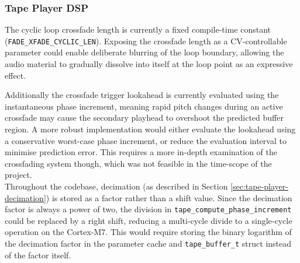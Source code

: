 \subsubsection{Tape Player DSP}
The cyclic loop crossfade length is currently a fixed compile-time constant (\texttt{FADE\_XFADE\_CYCLIC\_LEN}).
Exposing the crossfade length as a CV-controllable parameter could enable deliberate blurring of the loop boundary, allowing the audio material to gradually dissolve into itself at the loop point as an expressive effect.

Additionally the crossfade trigger lookahead is currently evaluated using the instantaneous phase increment, meaning rapid pitch changes during an active crossfade may cause the secondary playhead to overshoot the predicted buffer region.
A more robust implementation would either evaluate the lookahead using a conservative worst-case phase increment, or reduce the evaluation interval to minimise prediction error.
This requires a more in-depth examination of the crossfading system though, which was not feasible in the time-scope of the project. \\

Throughout the codebase, decimation (as described in Section \ref{sec:tape-player-decimation}) is stored as a factor rather than a shift value.
Since the decimation factor is always a power of two, the division in \texttt{tape\_compute\_phase\_increment} could be replaced by a right shift, reducing a multi-cycle divide to a single-cycle operation on the Cortex-M7.
This would require storing the binary logarithm of the decimation factor in the parameter cache and \texttt{tape\_buffer\_t} struct instead of the factor itself.

